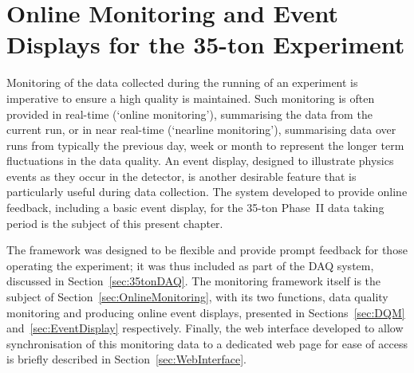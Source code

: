 
\graphicspath{{OnlineMonitoring/Figs/}}

\chapter{Online Monitoring and Event Displays for the 35-ton Experiment}\label{chap:OnlineMonitoring}

Monitoring of the data collected during the running of an experiment is imperative to ensure a high quality is maintained.  Such monitoring is often provided in real-time (`online monitoring'), summarising the data from the current run, or in near real-time (`nearline monitoring'), summarising data over runs from typically the previous day, week or month to represent the longer term fluctuations in the data quality.  An event display, designed to illustrate physics events as they occur in the detector, is another desirable feature that is particularly useful during data collection.  The system developed to provide online feedback, including a basic event display, for the 35-ton Phase~II data taking period is the subject of this present chapter.

The framework was designed to be flexible and provide prompt feedback for those operating the experiment; it was thus included as part of the DAQ system, discussed in Section~\ref{sec:35tonDAQ}.  The monitoring framework itself is the subject of Section~\ref{sec:OnlineMonitoring}, with its two functions, data quality monitoring and producing online event displays, presented in Sections~\ref{sec:DQM} and~\ref{sec:EventDisplay} respectively.  Finally, the web interface developed to allow synchronisation of this monitoring data to a dedicated web page for ease of access is briefly described in Section~\ref{sec:WebInterface}.



